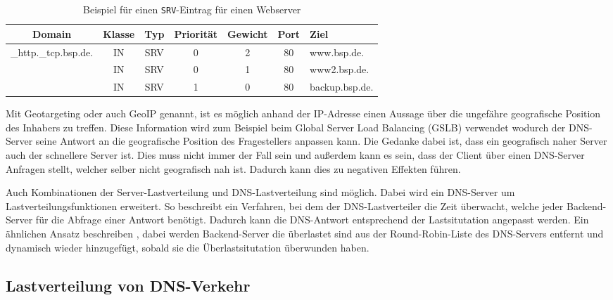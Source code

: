 \documentclass[a4paper, 12pt, BCOR10mm, DIV12, toc=bibliography, toc=listof, german]{scrbook}
\begin{document}
			\begin{table}
				\centering
				\begin{tabular}{|ccccccl|}\hline
				 Domain & Klasse & Typ & Priorität & Gewicht & Port & Ziel \\\hline\hline
					\_http.\_tcp.bsp.de. & IN & SRV & 0 & 2 & 80 & www.bsp.de. \\	
					& IN & SRV & 0 & 1 & 80 & www2.bsp.de. \\	
					& IN & SRV & 1 & 0 & 80 & backup.bsp.de. \\\hline
				\end{tabular}
				\caption{Beispiel für einen \texttt{SRV}-Eintrag für einen Webserver}
				\label{tab:srv}
			\end{table} 
			
			Mit Geotargeting oder auch GeoIP genannt, ist es möglich anhand der IP-Adresse einen Aussage
			über die ungefähre geografische Position des Inhabers zu treffen. Diese Information wird zum
			Beispiel beim Global Server Load Balancing (GSLB) \cite{bourke2001} verwendet wodurch der
			DNS-Server seine Antwort an die geografische Position des Fragestellers anpassen kann. Die
			Gedanke dabei ist, dass ein geografisch naher Server auch der schnellere Server ist. Dies muss
			nicht immer der Fall sein und außerdem kann es sein, dass der Client über einen DNS-Server
			Anfragen stellt, welcher selber nicht geografisch nah ist. Dadurch kann dies zu negativen
			Effekten führen.

			Auch Kombinationen der Server-Lastverteilung und DNS-Lastverteilung sind möglich. Dabei wird ein
			DNS-Server um Lastverteilungsfunktionen erweitert. So beschreibt \cite{chyuyi2003} ein
			Verfahren, bei dem der DNS-Lastverteiler die Zeit überwacht, welche jeder Backend-Server für
			die Abfrage einer Antwort benötigt. Dadurch kann die DNS-Antwort entsprechend der
			Lastsitutation angepasst werden. Ein ähnlichen Ansatz beschreiben \cite{mookim2005}, dabei
			werden Backend-Server die überlastet sind aus der Round-Robin-Liste des DNS-Servers entfernt
			und dynamisch wieder hinzugefügt, sobald sie die Überlastsitutation überwunden haben.

			
			\subsection{Lastverteilung von DNS-Verkehr} %
			\label{sub:lastverteilung-dns}
\end{document}
